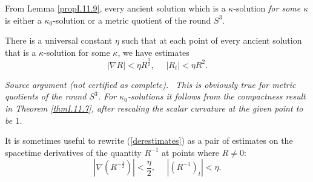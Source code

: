 From Lemma \ref{propI.11.9}, every ancient solution which is a
$\kappa$-solution {\em for some $\kappa$} is either a $\kappa_0$-solution
or a metric quotient of the round $S^3$.

\begin{lemma}
  \label{lem:kl-three-dimensional-solutions-existence-kappa-solutions-4}
 \label{derivativeestimates}
There is a universal constant
$\eta$ such that at each point of every ancient solution that is
a $\kappa$-solution for some $\kappa$, we have estimates
\begin{equation} \label{derestimates}
|\nabla R| < \eta R^{\frac32}, \: \: \: \: \: \: |R_t| < \eta R^2.
\end{equation}
\end{lemma}
\par\medskip\noindent\textit{Source argument (not certified as complete).}\ \begingroup\itshape
This is obviously true for metric quotients of the round $S^3$. For
$\kappa_0$-solutions it follows from the compactness result in
Theorem \ref{thmI.11.7}, after rescaling the scalar curvature at
the given point to be $1$.
\endgroup\par\medskip


It is sometimes useful to rewrite (\ref{derestimates}) as a pair of estimates
on the spacetime derivatives of the quantity $R^{-1}$ at points where $R\neq 0$:
\begin{equation}
\label{eqnderestimatesrinverse}
|\nabla (R^{-\frac12})| < \frac{\eta}{2}, \: \: \: \: \: \: |(R^{-1})_t| < \eta .
\end{equation}


